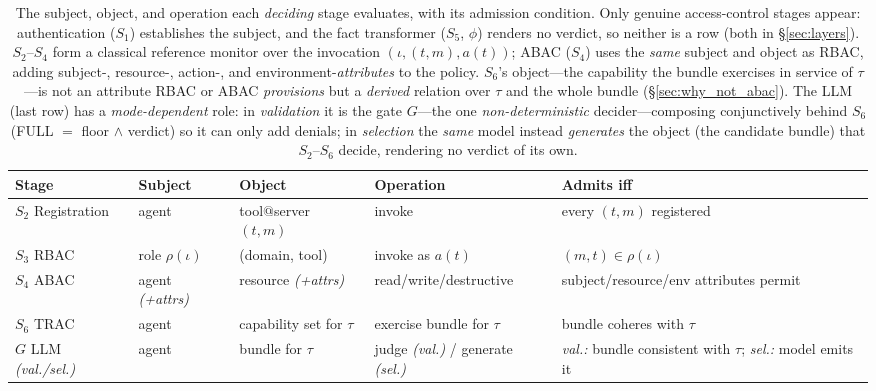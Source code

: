 \documentclass[sigconf,review,anonymous]{acmart}
\begin{document}
\begin{table}[!t]
\centering
\caption{The subject, object, and operation each \emph{deciding} stage evaluates, with its admission condition. Only genuine access-control stages appear: authentication ($S_1$) establishes the subject, and the fact transformer ($S_5$, $\phi$) renders no verdict, so neither is a row (both in \S\ref{sec:layers}). $S_2$--$S_4$ form a classical reference monitor over the invocation $(\iota,(t,m),a(t))$; ABAC ($S_4$) uses the \emph{same} subject and object as RBAC, adding subject-, resource-, action-, and environment-\emph{attributes} to the policy. $S_6$'s object---the capability the bundle exercises in service of $\tau$---is not an attribute RBAC or ABAC \emph{provisions} but a \emph{derived} relation over $\tau$ and the whole bundle (\S\ref{sec:why_not_abac}). The LLM (last row) has a \emph{mode-dependent} role: in \emph{validation} it is the gate $G$---the one \emph{non-deterministic} decider---composing conjunctively behind $S_6$ (FULL $=$ floor $\wedge$ verdict) so it can only add denials; in \emph{selection} the \emph{same} model instead \emph{generates} the object (the candidate bundle) that $S_2$--$S_6$ decide, rendering no verdict of its own.}
\label{tab:soo}
\footnotesize
\begin{adjustbox}{max width=\columnwidth}
\begin{tabular}{@{}lllll@{}}
\toprule
\textbf{Stage} & \textbf{Subject} & \textbf{Object} & \textbf{Operation} & \textbf{Admits iff} \\
\midrule
$S_2$ Registration & agent & tool$@$server $(t,m)$ & invoke & every $(t,m)$ registered \\
$S_3$ RBAC         & role $\rho(\iota)$ & (domain, tool) & invoke as $a(t)$ & $(m,t)\in\rho(\iota)$ \\
$S_4$ ABAC         & agent \emph{(+attrs)} & resource \emph{(+attrs)} & read/write/destructive & subject/resource/env attributes permit \\
$S_6$ TRAC         & agent & capability set for $\tau$ & exercise bundle for $\tau$ & bundle coheres with $\tau$ \\
$G$ LLM \emph{(val./sel.)} & agent & bundle for $\tau$ & judge \emph{(val.)} / generate \emph{(sel.)} & \emph{val.:} bundle consistent with $\tau$; \emph{sel.:} model emits it \\
\bottomrule
\end{tabular}
\end{adjustbox}
\end{table}
\end{document}

